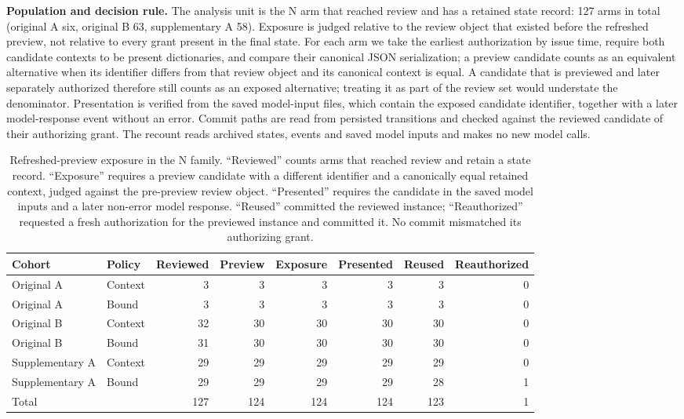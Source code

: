 \documentclass[10pt,a4paper]{article}
\begin{document}
\textbf{Population and decision rule.} The analysis unit is the N arm that reached review and has a retained state record: 127 arms in total (original A six, original B 63, supplementary A 58). Exposure is judged relative to the review object that existed before the refreshed preview, not relative to every grant present in the final state. For each arm we take the earliest authorization by issue time, require both candidate contexts to be present dictionaries, and compare their canonical JSON serialization; a preview candidate counts as an equivalent alternative when its identifier differs from that review object and its canonical context is equal. A candidate that is previewed and later separately authorized therefore still counts as an exposed alternative; treating it as part of the review set would understate the denominator. Presentation is verified from the saved model-input files, which contain the exposed candidate identifier, together with a later model-response event without an error. Commit paths are read from persisted transitions and checked against the reviewed candidate of their authorizing grant. The recount reads archived states, events and saved model inputs and makes no new model calls.

\begin{table}[htbp]
\centering\footnotesize
\setlength{\tabcolsep}{3pt}
\caption{Refreshed-preview exposure in the N family. ``Reviewed'' counts arms that reached review and retain a state record. ``Exposure'' requires a preview candidate with a different identifier and a canonically equal retained context, judged against the pre-preview review object. ``Presented'' requires the candidate in the saved model inputs and a later non-error model response. ``Reused'' committed the reviewed instance; ``Reauthorized'' requested a fresh authorization for the previewed instance and committed it. No commit mismatched its authorizing grant.}
\begin{tabular}{@{}llrrrrrr@{}}
\toprule
Cohort & Policy & Reviewed & Preview & Exposure & Presented & Reused & Reauthorized \\
\midrule
Original A & Context & 3 & 3 & 3 & 3 & 3 & 0 \\
Original A & Bound & 3 & 3 & 3 & 3 & 3 & 0 \\
Original B & Context & 32 & 30 & 30 & 30 & 30 & 0 \\
Original B & Bound & 31 & 30 & 30 & 30 & 30 & 0 \\
Supplementary A & Context & 29 & 29 & 29 & 29 & 29 & 0 \\
Supplementary A & Bound & 29 & 29 & 29 & 29 & 28 & 1 \\
\midrule
Total & & 127 & 124 & 124 & 124 & 123 & 1 \\
\bottomrule
\end{tabular}
\end{table}
\end{document}
